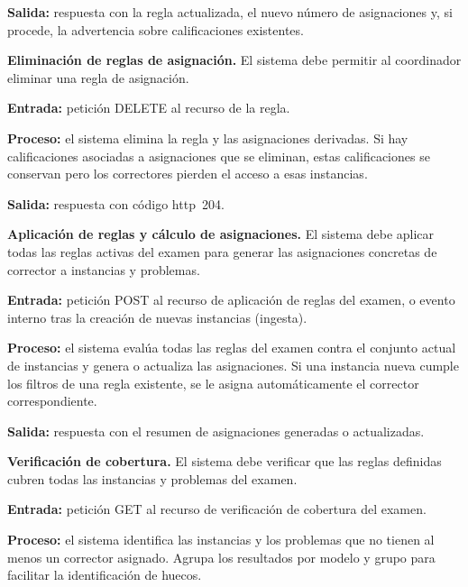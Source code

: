 \begin{functional}
    \textbf{Salida:} respuesta con la regla actualizada, el nuevo número de asignaciones y,
    si procede, la advertencia sobre calificaciones existentes.

    \item \textbf{Eliminación de reglas de asignación.} \label{rf:assignment:delete}
    El sistema debe permitir al coordinador eliminar una regla de asignación.

    \textbf{Entrada:} petición DELETE al recurso de la regla.

    \textbf{Proceso:} el sistema elimina la regla y las asignaciones derivadas. Si hay
    calificaciones asociadas a asignaciones que se eliminan, estas calificaciones se
    conservan pero los correctores pierden el acceso a esas instancias.

    \textbf{Salida:} respuesta con código \acs{http}~204.

    \item \textbf{Aplicación de reglas y cálculo de asignaciones.}
    \label{rf:assignment:apply}
    El sistema debe aplicar todas las reglas activas del examen para generar las
    asignaciones concretas de corrector a instancias y problemas.

    \textbf{Entrada:} petición POST al recurso de aplicación de reglas del examen, o evento
    interno tras la creación de nuevas instancias (ingesta).

    \textbf{Proceso:} el sistema evalúa todas las reglas del examen contra el conjunto
    actual de instancias y genera o actualiza las asignaciones. Si una instancia nueva
    cumple los filtros de una regla existente, se le asigna automáticamente el corrector
    correspondiente.

    \textbf{Salida:} respuesta con el resumen de asignaciones generadas o actualizadas.

    \item \textbf{Verificación de cobertura.} \label{rf:assignment:coverage}
    El sistema debe verificar que las reglas definidas cubren todas las instancias y
    problemas del examen.

    \textbf{Entrada:} petición GET al recurso de verificación de cobertura del examen.

    \textbf{Proceso:} el sistema identifica las instancias y los problemas que no tienen al
    menos un corrector asignado. Agrupa los resultados por modelo y grupo para facilitar la
    identificación de huecos.


\end{functional}
